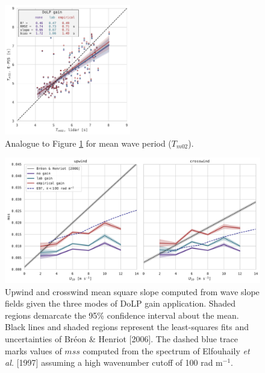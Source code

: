 \documentclass[letterpaper,journal]{IEEEtran}
\begin{document}
\begin{figure}[!ht]
    \centering
    \includegraphics[width=0.49\textwidth]{_figures/Tm02_comparison_lidar_epss.pdf}
    \vspace{-20pt}
    \caption{Analogue to Figure \ref{fig:Tm02_comparison_lidar_epss} for mean wave period ($T_{m02}$).}
    \label{fig:Tm02_comparison_lidar_epss}
\end{figure}

\newpage

\begin{figure}[!ht]
    \centering
    \includegraphics[width=\textwidth]{_figures/mss_upwind_crosswind.pdf}
    \vspace{-20pt}
    \caption{Upwind and crosswind mean square slope computed from wave slope fields given the three modes of DoLP gain application. Shaded regions demarcate the 95\% confidence interval about the mean. Black lines and shaded regions represent the least-squares fits and uncertainties of Br\'eon \& Henriot [2006]. The dashed blue trace marks values of $mss$ computed from the spectrum of Elfouhaily \emph{et al.} [1997] \cite{Elfouhaily1997} assuming a high wavenumber cutoff of 100 rad m$^{-1}$.}
    \label{fig:mss_upwind_crosswind}
    \vspace{-10pt}
\end{figure}
\end{document}

